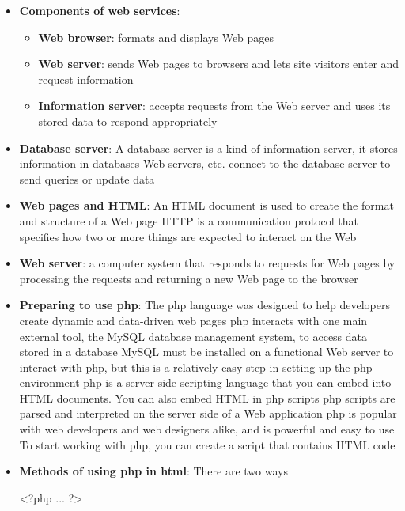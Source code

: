 \documentclass{report}
\begin{document}
    \begin{itemize}
        \item \textbf{Components of web services}: 
            \begin{itemize}
                \item \textbf{Web browser}: formats and displays Web pages
                \item \textbf{Web server}: sends Web pages to browsers and lets site visitors enter and request information
                \item \textbf{Information server}: accepts requests from the Web server and uses its stored data to respond appropriately
            \end{itemize}
        \item \textbf{Database server}: A database server is a kind of information server, it stores information in databases
            \bigbreak \noindent 
            Web servers, etc. connect to the database server to send queries or update data
        \item \textbf{Web pages and HTML}: An HTML document is used to create the format and structure of a Web page
            \bigbreak \noindent 
                HTTP is a communication protocol that specifies how two or more things are expected to interact on the Web
        \item \textbf{Web server}: a computer system that responds to requests for Web pages by processing the requests and returning a new Web page to the browser
        \item \textbf{Preparing to use php}: The php language was designed to help developers create dynamic and data-driven web pages
            \bigbreak \noindent 
            php interacts with one main external tool, the MySQL database management system, to access data stored in a database
            \bigbreak \noindent 
            MySQL must be installed on a functional Web server to interact with php, but this is a relatively easy step in setting up the php environment
            \bigbreak \noindent 
            php is a server-side scripting language that you can embed into HTML documents. You can also embed HTML in php scripts
            \bigbreak \noindent 
            php scripts are parsed and interpreted on the server side of a Web application
            \bigbreak \noindent 
            php is popular with web developers and web designers alike, and is powerful and easy to use
            \bigbreak \noindent 
            To start working with php, you can create a script that contains HTML code
        \item \textbf{Methods of using php in html}: There are two ways 
            \begin{bashcode}
            <?php 
                ...
            ?>


\end{bashcode}
\end{itemize}
\end{document}
